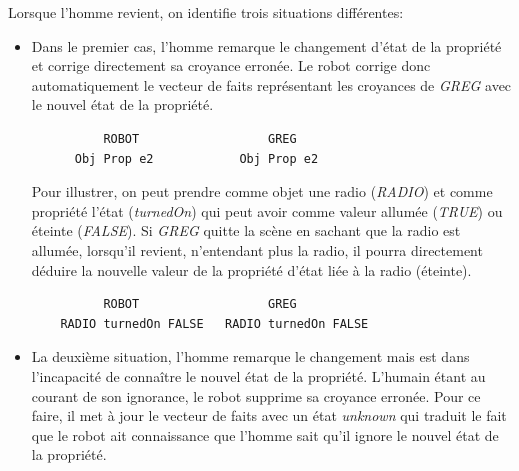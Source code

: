 \documentclass[a4paper,11pt,twoside]{StyleThese}
\begin{document}
Lorsque l'homme revient, on identifie trois situations différentes:

\begin{itemize}
\item Dans le premier cas, l'homme remarque le changement d'état de la propriété et corrige directement sa croyance erronée. Le robot corrige donc automatiquement le vecteur de faits représentant les croyances de \textit{GREG} avec le nouvel état de la propriété. 


\begin{scriptsize}
\begin{verbatim}
          ROBOT                  GREG
      Obj Prop e2            Obj Prop e2
\end{verbatim}
\end{scriptsize}


Pour illustrer, on peut prendre comme objet une radio (\textit{RADIO}) et comme propriété l'état (\textit{turnedOn}) qui peut avoir comme valeur allumée (\textit{TRUE}) ou éteinte (\textit{FALSE}). Si \textit{GREG} quitte la scène en sachant que la radio est allumée, lorsqu'il revient, n'entendant plus la radio, il pourra directement déduire la nouvelle valeur de la propriété d'état liée à la radio (éteinte).


\begin{scriptsize}
\begin{verbatim}
          ROBOT                  GREG
    RADIO turnedOn FALSE   RADIO turnedOn FALSE
\end{verbatim}
\end{scriptsize}


\item La deuxième situation, l'homme remarque le changement mais est dans l'incapacité de connaître le nouvel état de la propriété. L'humain étant au courant de son ignorance, le robot supprime sa croyance erronée. Pour ce faire, il met à jour le vecteur de faits avec un état \textit{unknown} qui traduit le fait que le robot ait connaissance que l'homme sait qu'il ignore le nouvel état de la propriété.



\end{itemize}
\end{document}
